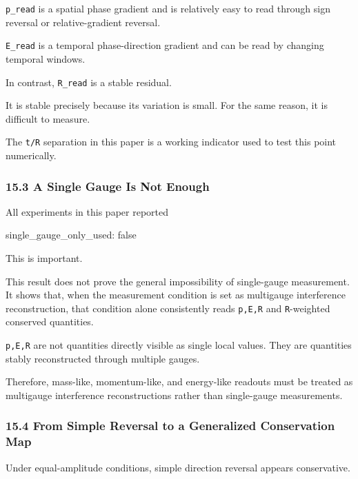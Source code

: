 \documentclass[
  a4paper,
]{article}
\newenvironment{Shaded}{}{}
\newcommand{\NormalTok}[1]{#1}
\begin{document}
\texttt{p\_read} is a spatial phase gradient and is relatively easy to
read through sign reversal or relative-gradient reversal.

\texttt{E\_read} is a temporal phase-direction gradient and can be read
by changing temporal windows.

In contrast, \texttt{R\_read} is a stable residual.

It is stable precisely because its variation is small. For the same
reason, it is difficult to measure.

The \texttt{t/R} separation in this paper is a working indicator used to
test this point numerically.

\subsubsection{15.3 A Single Gauge Is Not
Enough}\label{a-single-gauge-is-not-enough}

All experiments in this paper reported

\begin{Shaded}
\begin{Highlighting}[]
\NormalTok{single\_gauge\_only\_used: false}
\end{Highlighting}
\end{Shaded}

This is important.

This result does not prove the general impossibility of single-gauge
measurement. It shows that, when the measurement condition is set as
multigauge interference reconstruction, that condition alone
consistently reads \texttt{p,E,R} and \texttt{R}-weighted conserved
quantities.

\texttt{p,E,R} are not quantities directly visible as single local
values. They are quantities stably reconstructed through multiple
gauges.

Therefore, mass-like, momentum-like, and energy-like readouts must be
treated as multigauge interference reconstructions rather than
single-gauge measurements.

\subsubsection{15.4 From Simple Reversal to a Generalized Conservation
Map}\label{from-simple-reversal-to-a-generalized-conservation-map}

Under equal-amplitude conditions, simple direction reversal appears
conservative.
\end{document}
